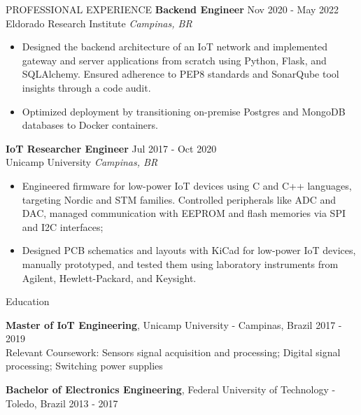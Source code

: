 \documentclass{resume} %
\begin{document}
\begin{rSection}{PROFESSIONAL EXPERIENCE}
\textbf{Backend Engineer} \hfill Nov 2020 - May 2022\\
Eldorado Research Institute \hfill \textit{Campinas, BR}
 \begin{itemize}
    \itemsep -3pt {} 
     \item Designed the backend architecture of an IoT network and implemented gateway and server applications from scratch using Python, Flask, and SQLAlchemy. Ensured adherence to PEP8 standards and SonarQube tool insights through a code audit.
     \item Optimized deployment by transitioning on-premise Postgres and MongoDB databases to Docker containers.
 \end{itemize}

\textbf{IoT Researcher Engineer} \hfill Jul 2017 - Oct 2020\\
Unicamp University \hfill \textit{Campinas, BR}
 \begin{itemize}
    \itemsep -3pt {} 
     \item Engineered firmware for low-power IoT devices using C and C++ languages, targeting Nordic and STM families. Controlled peripherals like ADC and DAC, managed communication with EEPROM and flash memories via SPI and I2C interfaces;
     \item Designed PCB schematics and layouts with KiCad for low-power IoT devices, manually prototyped, and tested them using laboratory instruments from Agilent, Hewlett-Packard, and Keysight.
 \end{itemize}

\end{rSection} 


\begin{rSection}{Education}

    {\bf Master of IoT Engineering}, Unicamp University - Campinas, Brazil \hfill {2017 - 2019}\\
    Relevant Coursework: Sensors signal acquisition and processing; Digital signal processing; Switching power supplies
    
    {\bf Bachelor of Electronics Engineering}, Federal University of Technology - Toledo, Brazil  \hfill {2013 - 2017}
    
    
    \end{rSection}
    
\end{document}
